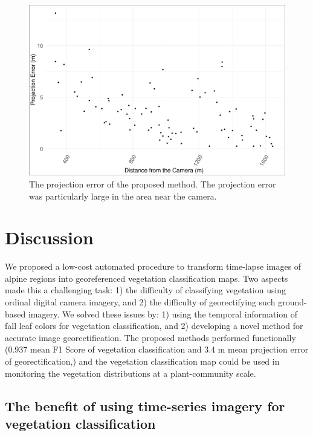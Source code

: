 \documentclass{article}
\begin{document}
\begin{figure}
\includegraphics[width=1\linewidth]{paper_files/figures/georec_acc} \caption{The projection error of the proposed method. The projection error was particularly large in the area near the camera.}\label{fig:geoacc}
\end{figure}

\hypertarget{discussion}{%
\section{Discussion}\label{discussion}}

We proposed a low-cost automated procedure to transform time-lapse images of alpine regions into georeferenced vegetation classification maps. Two aspects made this a challenging task: 1) the difficulty of classifying vegetation using ordinal digital camera imagery, and 2) the difficulty of georectifying such ground-based imagery. We solved these issues by: 1) using the temporal information of fall leaf colors for vegetation classification, and 2) developing a novel method for accurate image georectification. The proposed methods performed functionally (0.937 mean F1 Score of vegetation classification and 3.4 m mean projection error of georectification,) and the vegetation classification map could be used in monitoring the vegetation distributions at a plant-community scale.

\hypertarget{the-benefit-of-using-time-series-imagery-for-vegetation-classification}{%
\subsection{The benefit of using time-series imagery for vegetation classification}\label{the-benefit-of-using-time-series-imagery-for-vegetation-classification}}
\end{document}
